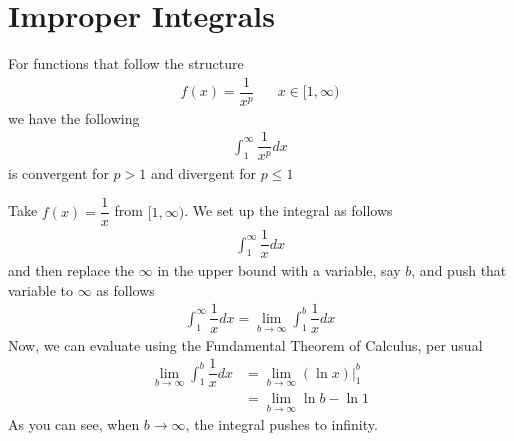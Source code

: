 \section{Improper Integrals}

\begin{theorem}
For functions that follow the structure
\begin{align*}
    f(x) = \dfrac{1}{x^{p}} \hspace{20pt} x \in [1, \infty)
\end{align*}
we have the following
\begin{align*}
    \int_{1}^{\infty} \dfrac{1}{x^{p}} dx
\end{align*}
is convergent for $p > 1$ and divergent for $p \leq 1$
\end{theorem}

\begin{example}
Take $f(x) = \dfrac{1}{x}$ from $[1, \infty)$. We set up the integral as follows
\begin{align*}
    \int_{1}^{\infty} \dfrac{1}{x} dx
\end{align*}
and then replace the $\infty$ in the upper bound with a variable, say $b$, and push that variable to $\infty$ as follows
\begin{align*}
    \int_{1}^{\infty} \dfrac{1}{x} dx = \lim_{b \longrightarrow \infty} \int_{1}^{b} \dfrac{1}{x} dx
\end{align*}
Now, we can evaluate using the Fundamental Theorem of Calculus, per usual
\begin{align*}
    \lim_{b \longrightarrow \infty} \int_{1}^{b} \dfrac{1}{x} dx &= \lim_{b \longrightarrow \infty} (\ln x) \Big|_{1}^{b}\\[2ex]
    &= \lim_{b \longrightarrow \infty} \ln b - \ln 1 
\end{align*}
As you can see, when $b \longrightarrow \infty$, the integral pushes to infinity. 
\end{example}